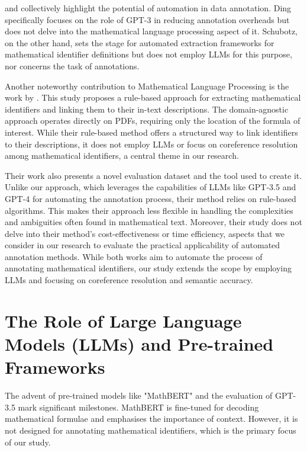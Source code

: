 \citet{ding2022gpt} and \citet{schubotz2017evaluating} collectively highlight the potential of automation in data annotation. Ding specifically focuses on the role of GPT-3 in reducing annotation overheads but does not delve into the mathematical language processing aspect of it. Schubotz, on the other hand, sets the stage for automated extraction frameworks for mathematical identifier definitions but does not employ \ac{LLMs} for this purpose, nor concerns the task of annotations.

Another noteworthy contribution to Mathematical Language Processing is the work by \citet{alexeeva2020mathalign}. This study proposes a rule-based approach for extracting mathematical identifiers and linking them to their in-text descriptions. The domain-agnostic approach operates directly on PDFs, requiring only the location of the formula of interest. While their rule-based method offers a structured way to link identifiers to their descriptions, it does not employ LLMs or focus on coreference resolution among mathematical identifiers, a central theme in our research.

Their work also presents a novel evaluation dataset and the tool used to create it. Unlike our approach, which leverages the capabilities of LLMs like GPT-3.5 and GPT-4 for automating the annotation process, their method relies on rule-based algorithms. This makes their approach less flexible in handling the complexities and ambiguities often found in mathematical text. Moreover, their study does not delve into their method's cost-effectiveness or time efficiency, aspects that we consider in our research to evaluate the practical applicability of automated annotation methods. While both works aim to automate the process of annotating mathematical identifiers, our study extends the scope by employing LLMs and focusing on coreference resolution and semantic accuracy.


\section{The Role of Large Language Models (LLMs) and Pre-trained Frameworks}

The advent of pre-trained models like "MathBERT" \citep{peng2021mathbert} and the evaluation of GPT-3.5 \citep{he2023annollm} mark significant milestones. MathBERT is fine-tuned for decoding mathematical formulae and emphasises the importance of context. However, it is not designed for annotating mathematical identifiers, which is the primary focus of our study.

